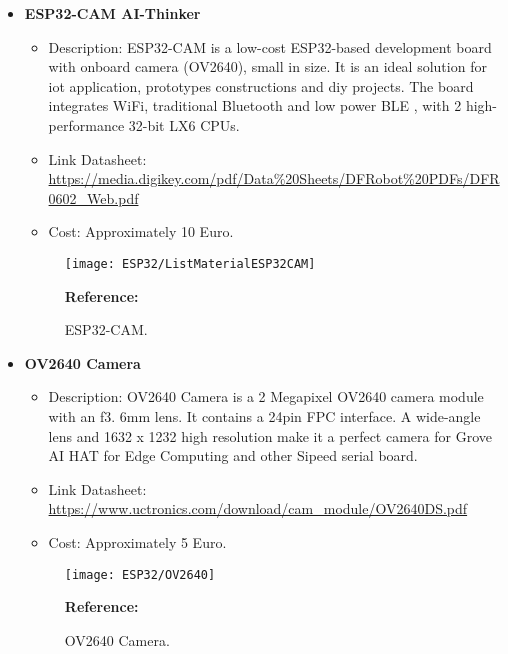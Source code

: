 \begin{itemize}
    \item \textbf{ESP32-CAM AI-Thinker} 
    
    \begin{itemize}
        \item Description: ESP32-CAM is a low-cost ESP32-based development board with onboard camera (OV2640), small in size. It is an ideal solution for \ac{iot} application, prototypes constructions and \ac{diy} projects. The board integrates WiFi, traditional Bluetooth and low power BLE , with 2 high-performance 32-bit LX6 CPUs.
        \item Link Datasheet: \url{https://media.digikey.com/pdf/Data%20Sheets/DFRobot%20PDFs/DFR0602_Web.pdf}
        \item Cost: Approximately 10 Euro.
    \end{itemize}
    
    \begin{figure}  
        \begin{center}
            \texttt{[image: ESP32/ListMaterialESP32CAM]}
            \caption{ESP32-CAM.} 
            \label{fig:ESP32-CAM.}
            \footnotesize \textbf{Reference:} \cite{Elektor:2022}
        \end{center}
    \end{figure}	
    
    \item\textbf{OV2640 Camera} 
    
    \begin{itemize}
        \item Description: OV2640 Camera is a 2 Megapixel OV2640 camera module with an f3. 6mm lens. It contains a 24pin FPC interface. A wide-angle lens and 1632 x 1232 high resolution make it a perfect camera for Grove AI HAT for Edge Computing and other Sipeed serial board.
        \item Link Datasheet: \url{https://www.uctronics.com/download/cam_module/OV2640DS.pdf}
        \item Cost: Approximately 5 Euro.
    \end{itemize}
    \begin{figure}  
        
        \begin{center}
            \texttt{[image: ESP32/OV2640]}
            \caption{OV2640 Camera.} 
            \label{fig:OV2640 Camera.}
            \footnotesize \textbf{Reference:} \cite{ArduCam:2022}
        \end{center}
    \end{figure}	
    

\end{itemize}
